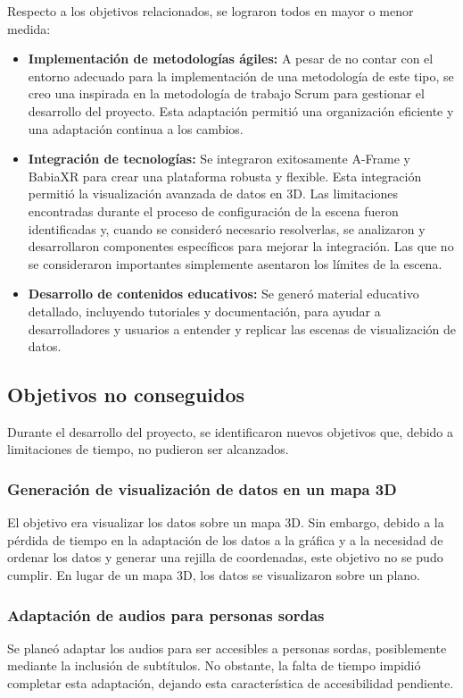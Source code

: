 \documentclass[a4paper, 12pt]{book}
\begin{document}
Respecto a los objetivos relacionados, se lograron todos en mayor o menor medida:
\begin{itemize}
    \item \textbf{Implementación de metodologías ágiles: }
A pesar de no contar con el entorno adecuado para la implementación de una metodología de este tipo, se creo una inspirada en la metodología de trabajo Scrum para gestionar el desarrollo del proyecto. Esta adaptación permitió una organización eficiente y una adaptación continua a los cambios.
    \item \textbf{Integración de tecnologías: }
Se integraron exitosamente A-Frame y BabiaXR para crear una plataforma robusta y flexible. Esta integración permitió la visualización avanzada de datos en 3D. Las limitaciones encontradas durante el proceso de configuración de la escena fueron identificadas y, cuando se consideró necesario resolverlas, se analizaron y desarrollaron componentes específicos para mejorar la integración. Las que no se consideraron importantes simplemente asentaron los límites de la escena.

    \item \textbf{Desarrollo de contenidos educativos: }
Se generó material educativo detallado, incluyendo tutoriales y documentación, para ayudar a desarrolladores y usuarios a entender y replicar las escenas de visualización de datos.
\end{itemize}




\subsection{Objetivos no conseguidos}

Durante el desarrollo del proyecto, se identificaron nuevos objetivos que, debido a limitaciones de tiempo, no pudieron ser alcanzados.

\subsubsection{Generación de visualización de datos en un mapa 3D}
El objetivo era visualizar los datos sobre un mapa 3D. Sin embargo, debido a la pérdida de tiempo en la adaptación de los datos a la gráfica y a la necesidad de ordenar los datos y generar una rejilla de coordenadas, este objetivo no se pudo cumplir. En lugar de un mapa 3D, los datos se visualizaron sobre un plano.

\subsubsection{Adaptación de audios para personas sordas}
Se planeó adaptar los audios para ser accesibles a personas sordas, posiblemente mediante la inclusión de subtítulos. No obstante, la falta de tiempo impidió completar esta adaptación, dejando esta característica de accesibilidad pendiente.
\end{document}
